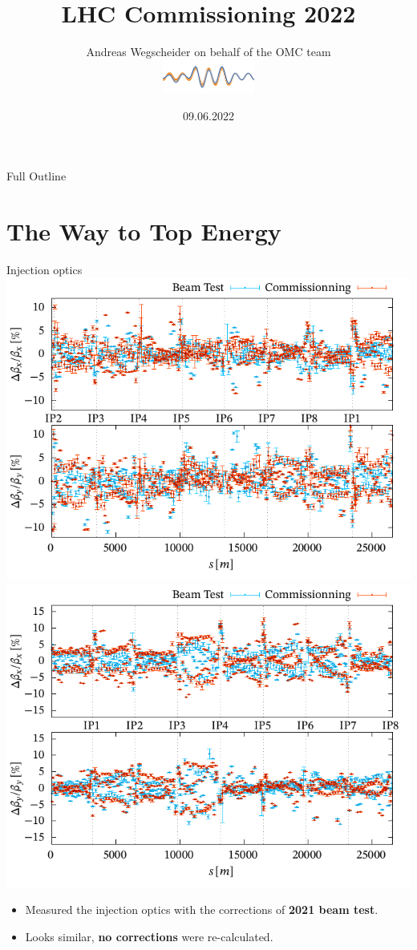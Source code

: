 \documentclass[4pt,usenames,dvipsnames,aspectratio=169]{beamer}
\author[OMC]{%
Andreas Wegscheider on behalf of the OMC team\\%
\centering%
\includegraphics[width=3cm]{omc-logo.pdf}%
}
\title[LHC 2022]{LHC Commissioning 2022}
\institute{CERN}
\date[09.06.22]{09.06.2022}
\newcommand{\highl}[1]{\textbf{#1}}
\begin{document}
\begin{frame}
    \titlepage
\end{frame}


\begin{frame}{Full Outline}
\tableofcontents
\end{frame}


\section{The Way to Top Energy}



\begin{frame}{Injection optics}
    \includegraphics[width=0.49\linewidth]{images/beamtest/b1_bb.pdf}
    \hfill
    \includegraphics[width=0.49\linewidth]{images/beamtest/b2_bb.pdf}
    
    \begin{itemize}
        \item  Measured the injection optics with the corrections of \highl{2021 beam test}.
        \item Looks similar, \highl{no corrections} were re-calculated.
    \end{itemize}
\end{frame}


\end{document}
